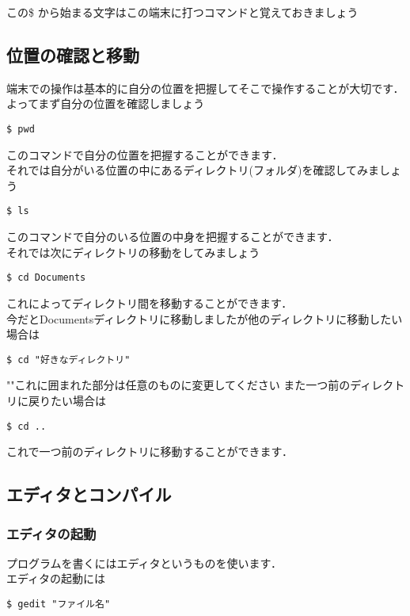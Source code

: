 \documentclass[a4j,titlepage,dvipdfmx]{jsarticle}   %
\begin{document}
この\$ から始まる文字はこの端末に打つコマンドと覚えておきましょう

\subsection{位置の確認と移動}
端末での操作は基本的に自分の位置を把握してそこで操作することが大切です．\\
よってまず自分の位置を確認しましょう\\
\begin{lstlisting}
$ pwd
\end{lstlisting}

このコマンドで自分の位置を把握することができます．\\
それでは自分がいる位置の中にあるディレクトリ(フォルダ)を確認してみましょう\\
\begin{lstlisting}
$ ls
\end{lstlisting}

このコマンドで自分のいる位置の中身を把握することができます．\\
それでは次にディレクトリの移動をしてみましょう
\begin{lstlisting}
$ cd Documents
\end{lstlisting}

これによってディレクトリ間を移動することができます．\\
今だとDocumentsディレクトリに移動しましたが他のディレクトリに移動したい場合は
\begin{lstlisting}
$ cd "好きなディレクトリ"
\end{lstlisting}

""これに囲まれた部分は任意のものに変更してください
また一つ前のディレクトリに戻りたい場合は
\begin{lstlisting}
$ cd ..
\end{lstlisting}

これで一つ前のディレクトリに移動することができます．

\subsection{エディタとコンパイル}
\subsubsection{エディタの起動}
プログラムを書くにはエディタというものを使います．\\
エディタの起動には

\begin{lstlisting}
$ gedit "ファイル名"
\end{lstlisting}
\end{document}
